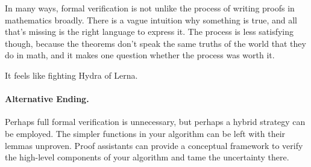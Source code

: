 \documentclass{article}
\begin{document}
In many ways, formal verification is not unlike the process of writing proofs in mathematics broadly.
There is a vague intuition why something is true, and all that's missing is the right language to express it.
The process is less satisfying though, because the theorems don't speak the same truths of the world that they do in math, and it makes one question whether the process was worth it.

It feels like fighting Hydra of Lerna.

\paragraph{Alternative Ending.}
Perhaps full formal verification is unnecessary, but perhaps a hybrid strategy can be employed.
The simpler functions in your algorithm can be left with their lemmas unproven.
Proof assistants can provide a conceptual framework to verify the high-level components of your algorithm and tame the uncertainty there.



\end{document}
